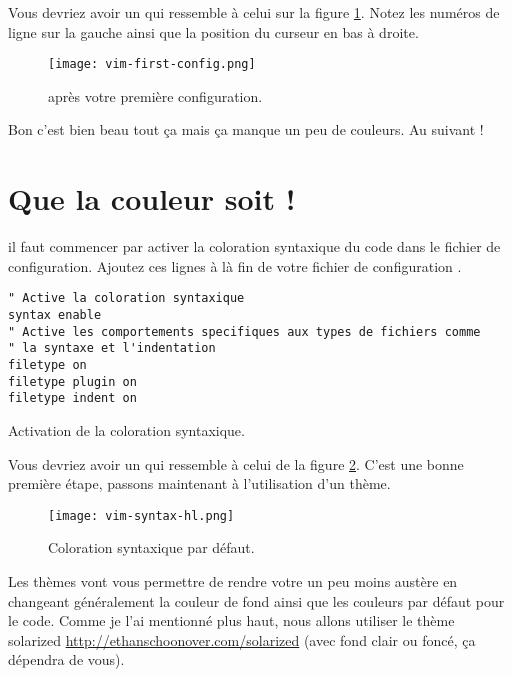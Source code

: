 Vous devriez avoir un \vim qui ressemble à celui sur la figure \ref{fig:first-config}. Notez les numéros de ligne sur la gauche ainsi que la position du curseur en bas à droite.

\begin{figure}%
  \texttt{[image: vim-first-config.png]}
  \caption{\vim après votre première configuration.}
  \label{fig:first-config}
\end{figure}

Bon c'est bien beau tout ça mais ça manque un peu de couleurs. Au suivant !

\section{Que la couleur soit !}

 il faut commencer par activer la coloration syntaxique du code dans le fichier de configuration. Ajoutez ces lignes à là fin de votre fichier de configuration \vimrc.

\begin{listing}[H]
\begin{verbatim}
" Active la coloration syntaxique
syntax enable
" Active les comportements specifiques aux types de fichiers comme
" la syntaxe et l'indentation
filetype on
filetype plugin on
filetype indent on
\end{verbatim}
  \caption{Activation de la coloration syntaxique.}
  \label{lst:syntax-hl}
\end{listing}

Vous devriez avoir un \vim qui ressemble à celui de la figure \ref{fig:syntax-hl}. C'est une bonne première étape, passons maintenant à l'utilisation d'un thème.

\begin{figure}%
  \texttt{[image: vim-syntax-hl.png]}
  \caption{Coloration syntaxique par défaut.}
  \label{fig:syntax-hl}
\end{figure}

Les thèmes vont vous permettre de rendre votre \vim un peu moins austère en changeant généralement la couleur de fond ainsi que les couleurs par défaut pour le code. Comme je l'ai mentionné plus haut, nous allons utiliser le thème solarized \url{http://ethanschoonover.com/solarized} (avec fond clair ou foncé, ça dépendra de vous).

